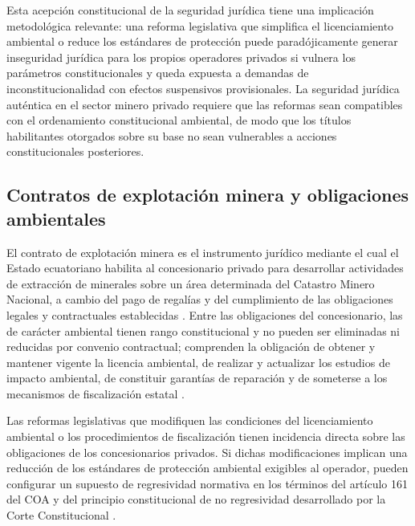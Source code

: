 Esta acepción constitucional de la seguridad jurídica tiene una implicación metodológica relevante: una reforma legislativa que simplifica el licenciamiento ambiental o reduce los estándares de protección puede paradójicamente generar inseguridad jurídica para los propios operadores privados si vulnera los parámetros constitucionales y queda expuesta a demandas de inconstitucionalidad con efectos suspensivos provisionales. La seguridad jurídica auténtica en el sector minero privado requiere que las reformas sean compatibles con el ordenamiento constitucional ambiental, de modo que los títulos habilitantes otorgados sobre su base no sean vulnerables a acciones constitucionales posteriores.

\subsection{Contratos de explotación minera y obligaciones ambientales}

El contrato de explotación minera es el instrumento jurídico mediante el cual el Estado ecuatoriano habilita al concesionario privado para desarrollar actividades de extracción de minerales sobre un área determinada del Catastro Minero Nacional, a cambio del pago de regalías y del cumplimiento de las obligaciones legales y contractuales establecidas \parencite{ley_mineria_2025}. Entre las obligaciones del concesionario, las de carácter ambiental tienen rango constitucional y no pueden ser eliminadas ni reducidas por convenio contractual; comprenden la obligación de obtener y mantener vigente la licencia ambiental, de realizar y actualizar los estudios de impacto ambiental, de constituir garantías de reparación y de someterse a los mecanismos de fiscalización estatal \parencite{coa_2017,reglamento_coa_2019}.

Las reformas legislativas que modifiquen las condiciones del licenciamiento ambiental o los procedimientos de fiscalización tienen incidencia directa sobre las obligaciones de los concesionarios privados. Si dichas modificaciones implican una reducción de los estándares de protección ambiental exigibles al operador, pueden configurar un supuesto de regresividad normativa en los términos del artículo 161 del COA y del principio constitucional de no regresividad desarrollado por la Corte Constitucional \parencite{cce_1149_19_jp_21}.

